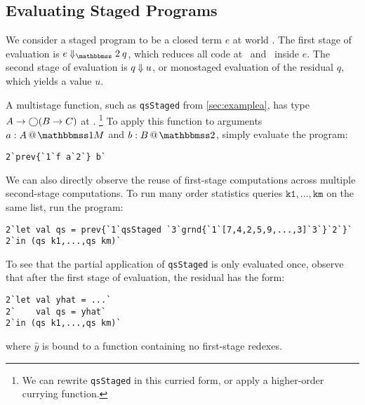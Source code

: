 

\subsection{Evaluating Staged Programs}

We consider a staged program to be a closed term $e$ at world \bbtwo. The first
stage of evaluation is $e\mathbin{\redtwosym} q$, which reduces all code at
\bbonem\ and \bbonep\ inside $e$. The second stage of evaluation is $q
\mathbin{{\Downarrow}} u$, or monostaged evaluation of the residual $q$, which yields
a value $u$.

A multistage function, such as \texttt{qsStaged} from \ref{sec:examplea}, has
type $A\to \bigcirc (B \to C)$ at \bbonem.%
\footnote{We can rewrite \texttt{qsStaged} in this curried form, or apply a
higher-order currying function.}
To apply this function to arguments $\colmix a A$ and $\coltwo b B$, simply
evaluate the program:
\begin{lstlisting}
2`prev{`1`f a`2`} b`
\end{lstlisting}

We can also directly observe the reuse of first-stage computations across
multiple second-stage computations. To run many order statistics queries
$\texttt{k1},\dots,\texttt{km}$ on the same list, run the program:
\begin{lstlisting}
2`let val qs = prev{`1`qsStaged `3`grnd{`1`[7,4,2,5,9,...,3]`3`}`2`}`
2`in (qs k1,...,qs km)`
\end{lstlisting}
To see that the partial application of \texttt{qsStaged} is only evaluated once,
observe that after the first stage of evaluation, the residual has the form:
\begin{lstlisting}
2`let val yhat = ...`
2`    val qs = yhat`
2`in (qs k1,...,qs km)`
\end{lstlisting}
where $\hat{y}$ is bound to a function containing no first-stage redexes.

